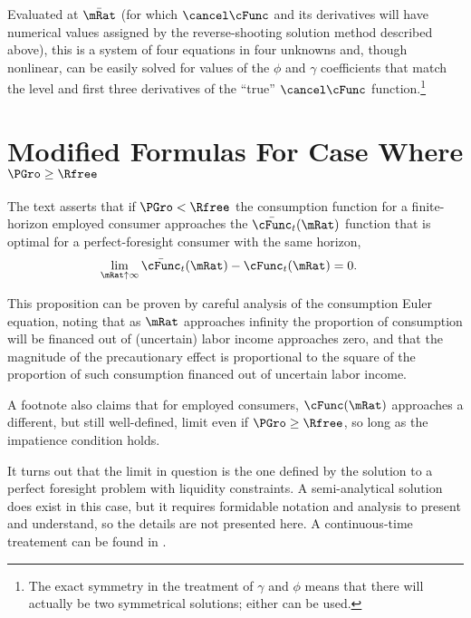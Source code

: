 \documentclass{\handout}
\begin{document}
Evaluated at $\bar{\mRat}$ (for which $\psavFunc$ and its derivatives will have numerical values
assigned by the reverse-shooting solution method described above), this is a system of four equations in four unknowns and, though nonlinear, can be easily solved for 
values of the $\phi$ and $\gamma$ coefficients that match the level and first three derivatives
of the ``true'' $\psavFunc$ function.\footnote{The exact symmetry in
  the treatment of $\gamma$ and $\phi$ means that there will actually
  be two symmetrical solutions; either can be used.}




\section{Modified Formulas For Case Where $\PGro \geq \Rfree$} \label{sec:PGroGEQRfree}

The text asserts that if $\PGro < \Rfree$ the consumption function for a finite-horizon employed consumer approaches
the $\bar{\cFunc}_{t}(\mRat)$ function that is optimal for a perfect-foresight
consumer with the same horizon,
\begin{equation}\begin{gathered}\begin{aligned}
  \lim_{\mRat \uparrow \infty} \bar{\cFunc}_{t}(\mRat) - \cFunc_{t}(\mRat) & =  0
.
\end{aligned}\end{gathered}\end{equation}

This proposition can be proven by careful analysis of the consumption Euler equation,
noting that as $\mRat$ approaches infinity the proportion of consumption will
be financed out of (uncertain) labor income approaches zero, and that the magnitude
of the precautionary effect is proportional to the square of the proportion of such
consumption financed out of uncertain labor income.

A footnote also claims that for employed consumers, $\cFunc(\mRat)$
approaches a different, but still well-defined, limit even if $\PGro
\geq \Rfree$, so long as the impatience condition holds.

It turns out that the limit in question is the one defined by the solution to a
perfect foresight problem with liquidity constraints.  A semi-analytical solution does
exist in this case, but it requires formidable notation and analysis to present and
understand, so the details are not presented here.  A continuous-time treatement
can be found in \cite{parkLiqConstrContinuous}.

\pagebreak

\end{document}
